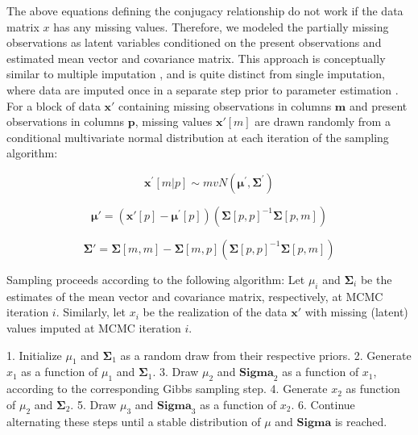 \documentclass{article}
\begin{document}
The above equations defining the conjugacy relationship do not work if the data matrix $x$ has any missing values.
Therefore, we modeled the partially missing observations as latent variables conditioned on the present observations and estimated mean vector and covariance matrix.
This approach is conceptually similar to multiple imputation \citep{white_2010_multiple,graham_2009_missing_data_analysis},
and is quite distinct from single imputation, where data are imputed once in a separate step prior to parameter estimation \citep{white_2010_multiple,graham_2009_missing_data_analysis}.
For a block of data $\mathbf{x\prime}$ containing missing observations in columns $\mathbf{m}$ and present observations in columns $\mathbf{p}$,
missing values $\mathbf{x\prime}[m]$ are drawn randomly from a conditional multivariate normal distribution at each iteration of the sampling algorithm:

\begin{equation}
\mathbf{x^\prime}[m|p] \sim mvN(\mathbf{\mu}^\prime, \mathbf{\Sigma}^\prime)
\end{equation}

\begin{equation}
\mathbf{\mu\prime} =
(\mathbf{x\prime}[p] - \mathbf{\mu^\prime}[p])
(\mathbf{\Sigma}[p,p]^{-1} \mathbf{\Sigma}[p,m])
\end{equation}

\begin{equation}
\mathbf{\Sigma\prime} = \mathbf{\Sigma}[m,m] -
\mathbf{\Sigma}[m,p]
(\mathbf{\Sigma}[p,p]^{-1} \mathbf{\Sigma}[p,m])
\end{equation}

Sampling proceeds according to the following algorithm:
Let $\mu_i$ and $\mathbf{\Sigma}_i$ be the estimates of the mean vector and covariance matrix, respectively, at MCMC iteration $i$.
Similarly, let $x_i$ be the realization of the data $\mathbf{x}\prime$ with missing (latent) values imputed at MCMC iteration $i$.

1. Initialize $\mu_1$ and $\mathbf{\Sigma}_1$ as a random draw from their respective priors.
2. Generate $x_1$ as a function of $\mu_1$ and $\mathbf{\Sigma}_1$.
3. Draw $\mu_2$ and $\mathbf{Sigma}_2$ as a function of $x_1$, according to the corresponding Gibbs sampling step.
4. Generate $x_2$ as function of $\mu_2$ and $\mathbf{\Sigma}_2$.
5. Draw $\mu_3$ and $\mathbf{Sigma}_3$ as a function of $x_2$.
6. Continue alternating these steps until a stable distribution of $\mu$ and $\mathbf{Sigma}$ is reached.
\end{document}
